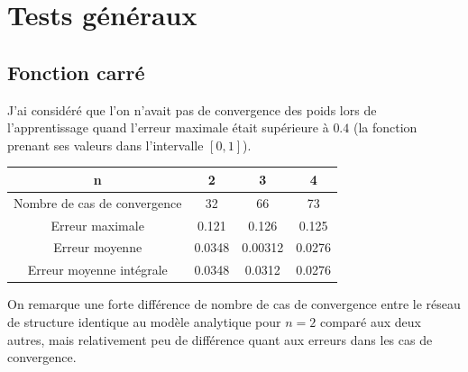 \documentclass[a4paper,11pt,twoside]{report}
\begin{document}
	
	\section{Tests généraux}
	\subsection{Fonction carré}
	J'ai considéré que l'on n'avait pas de convergence des poids lors de l'apprentissage quand l'erreur maximale était supérieure à $0.4$ (la fonction prenant ses valeurs dans l'intervalle $[0,1]$).
	\begin{center}
		\begin{tabular}{ |c||c|c|c| } 
			\hline
			n & 2 & 3 & 4 \\
			\hline
			\hline
			Nombre de cas de convergence & 32 & 66 & 73\\
			\hline
			Erreur maximale & 0.121 & 0.126 & 0.125\\
			\hline
			Erreur moyenne  & 0.0348 & 0.00312 & 0.0276\\
			\hline
			Erreur moyenne intégrale & 0.0348 & 0.0312 & 0.0276 \\
			\hline
		\end{tabular}	
	\end{center}
	On remarque une forte différence de nombre de cas de convergence entre le réseau de structure identique au modèle analytique pour $n=2$ comparé aux deux autres, mais relativement peu de différence quant aux erreurs dans les cas de convergence.
	
\end{document}

